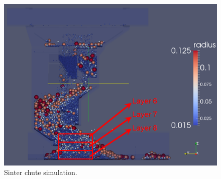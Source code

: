 \begin{figure}[!htb]
\centering
\includegraphics[width=.80\columnwidth]{067sinterchute}
\caption[Sinter chute simulation]{Sinter chute simulation.}
\label{fig:067sinterchute}
\end{figure}